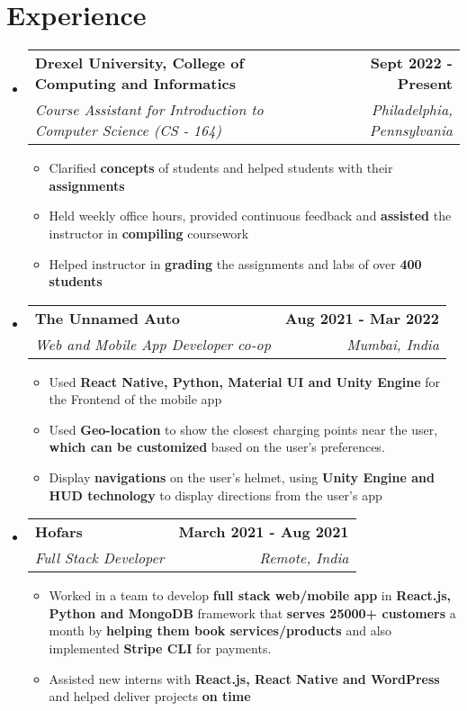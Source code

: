 \documentclass[letterpaper,7pt]{article}
\makeatletter
\newcommand{\resumeItem}[1]{
  \item\small{
    {#1 \vspace{-2pt}}
  }
}
\newcommand{\resumeSubheading}[4]{
  \vspace{-2pt}\item
    \begin{tabular*}{1.0\textwidth}[t]{l@{\extracolsep{\fill}}r}
      \textbf{#1} & \textbf{\small #2} \\
      \textit{\small#3} & \textit{\small #4} \\
    \end{tabular*}\vspace{-7pt}
}
\newcommand{\resumeSubHeadingListStart}{\begin{itemize}[leftmargin=0.0in, label={}]}
\newcommand{\resumeSubHeadingListEnd}{\end{itemize}}
\newcommand{\resumeItemListStart}{\begin{itemize}}
\newcommand{\resumeItemListEnd}{\end{itemize}\vspace{-5pt}}
\makeatother
\begin{document}
\section{Experience}
  \resumeSubHeadingListStart
    \resumeSubheading
      {Drexel University, College of Computing and Informatics}{Sept 2022 - Present}
      {Course Assistant for Introduction to Computer Science (CS - 164)}{Philadelphia, Pennsylvania}
      \resumeItemListStart
        \resumeItem{Clarified \textbf{concepts} of students and helped students with their \textbf{assignments}}
        \resumeItem{Held weekly office hours, provided continuous feedback and \textbf{assisted} the instructor in \textbf{compiling} coursework}
        \resumeItem{Helped instructor in \textbf{grading} the assignments and labs of over \textbf{400 students}}
        \vspace{3pt}
      \resumeItemListEnd
     
    \resumeSubheading
      {The Unnamed Auto}{Aug 2021 - Mar 2022}
      {Web and Mobile App Developer co-op}{Mumbai, India}
      \resumeItemListStart
        \resumeItem{Used \textbf{React Native, Python, Material UI and Unity Engine} for the Frontend of the mobile app}
        \resumeItem{Used \textbf{Geo-location} to show the closest charging points near the user, \textbf{which can be customized} based on the user's preferences.}
        \vspace{-11pt}
        \resumeItem{Display \textbf{navigations} on the user's helmet, using \textbf{Unity Engine and HUD technology} to display directions from the user's app}
      \resumeItemListEnd
     \vspace{4pt}

    \resumeSubheading
      {Hofars}{March 2021 - Aug 2021}
      {Full Stack Developer}{Remote, India}
      \resumeItemListStart
        \resumeItem{Worked in a team to develop \textbf{full stack web/mobile app} in \textbf{React.js, Python and MongoDB} framework that \textbf{serves 25000+ customers} a month by \textbf{helping them book services/products} and also implemented \textbf{Stripe CLI} for payments.}
        \resumeItem{Assisted new interns with \textbf{ React.js, React Native and WordPress} and helped deliver projects \textbf{on time}}
    \resumeItemListEnd
    
  \resumeSubHeadingListEnd
\vspace{-10pt}

\end{document}
